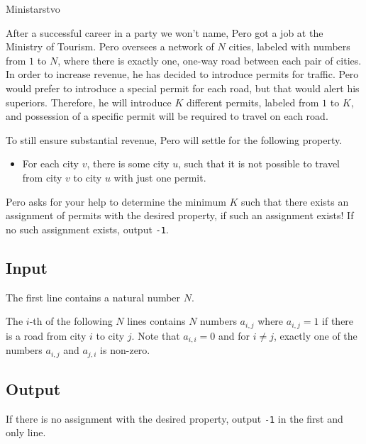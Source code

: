 \begin{statement}[
  problempoints=100,
  timelimit=1 second,
  memorylimit=1024 MiB,
]{Ministarstvo}

After a successful career in a party we won't name, Pero got a job at the Ministry of Tourism. Pero oversees a network of $N$ cities, labeled with numbers from $1$ to $N$, where there is exactly one, one-way road between each pair of cities. In order to increase revenue, he has decided to introduce permits for traffic. Pero would prefer to introduce a special permit for each road, but that would alert his superiors. Therefore, he will introduce $K$ different permits, labeled from $1$ to $K$, and possession of a specific permit will be required to travel on each road.

To still ensure substantial revenue, Pero will settle for the following property.

\begin{itemize}
\item For each city $v$, there is some city $u$, such that it is not possible to travel from city $v$ to city $u$ with just one permit.
\end{itemize} 

Pero asks for your help to determine the minimum $K$ such that there exists an assignment of permits with the desired property, if such an assignment exists! If no such assignment exists, output \texttt{-1}. 

\subsection*{Input}

The first line contains a natural number $N$.

The $i$-th of the following $N$ lines contains $N$ numbers $a_{i, j}$ where $a_{i, j} = 1$ if there is a road from city $i$ to city $j$. Note that $a_{i, i} = 0$ and for $i \neq j$, exactly one of the numbers $a_{i, j}$ and $a_{j, i}$ is non-zero. 

\subsection*{Output}

If there is no assignment with the desired property, output \texttt{-1} in the first and only line.


\end{statement}
